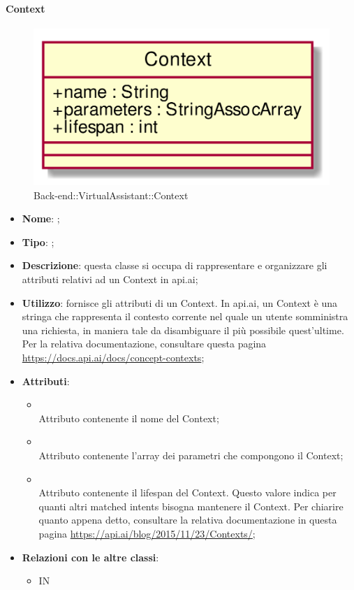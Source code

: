 \hypertarget{Context_label}{\paragraph{Context}}
\begin{figure}[h]
	\centering
	\includegraphics[width=\textwidth,height=\textheight,keepaspectratio]{images/ClassContext.png}
	\caption{Back-end::VirtualAssistant::Context}
\end{figure}
\begin{itemize}
	\item \textbf{Nome}: ;
	\item \textbf{Tipo}: ;
	\item \textbf{Descrizione}: questa classe si occupa di rappresentare e organizzare gli attributi relativi ad un Context in api.ai;
	\item \textbf{Utilizzo}: fornisce gli attributi di un Context.
In api.ai, un Context è una stringa che rappresenta il contesto corrente nel quale un utente somministra una richiesta, in maniera tale da disambiguare il più possibile quest'ultime. \\
Per la relativa documentazione, consultare questa pagina \url{https://docs.api.ai/docs/concept-contexts};
	\item \textbf{Attributi}:
	\begin{itemize}
		\item[]  \\
		Attributo contenente il nome del Context;
		\item[]  \\
		Attributo contenente l'array dei parametri che compongono il Context;
		\item[]  \\
		Attributo contenente il lifespan del Context.
Questo valore indica per quanti altri matched intents bisogna mantenere il Context.
Per chiarire quanto appena detto, consultare la relativa documentazione in questa pagina \url{https://api.ai/blog/2015/11/23/Contexts/};
	\end{itemize}
	\item \textbf{Relazioni con le altre classi}:
	\begin{itemize}
		\item IN \hyperlink{ProcessingResult_label}{}
	\end{itemize}
\end{itemize}
\FloatBarrier

